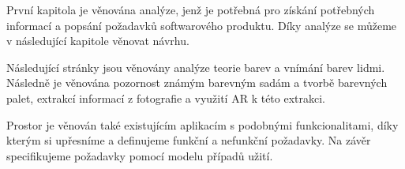 \begin{chapterabstract}
První kapitola je věnována analýze, jenž je potřebná pro získání potřebných informací
a popsání požadavků softwarového produktu. Díky analýze se můžeme v následující kapitole
věnovat návrhu.

Následující stránky jsou věnovány analýze teorie barev a vnímání barev lidmi. Následně
je věnována pozornost známým barevným sadám a tvorbě barevných palet, extrakcí informací z fotografie
a využití AR k této extrakci. 

Prostor je věnován také existujícím aplikacím s podobnými funkcionalitami, díky kterým si upřesníme a definujeme
funkční a nefunkční požadavky. Na závěr specifikujeme požadavky pomocí modelu případů užití.
\end{chapterabstract}







